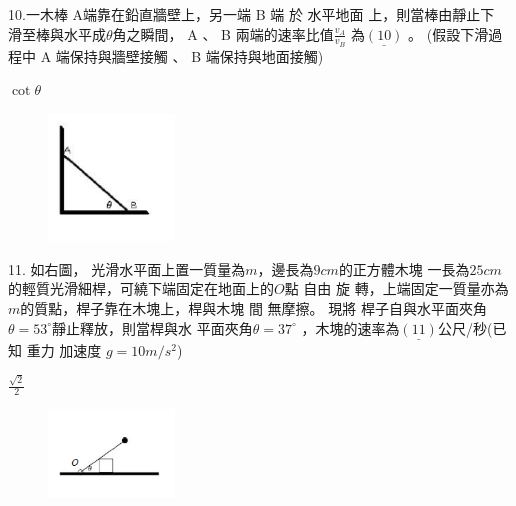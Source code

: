 \documentclass[cn,10pt,math=newtx]{elegantbook}
\begin{document}
\begin{example}
   10.一木棒 A端靠在鉛直牆壁上，另一端 B 端 於 水平地面 上，則當棒由靜止下
滑至棒與水平成$\theta$角之瞬間， A 、 B 兩端的速率比值$\frac{v_A}{v_B}$ 為$\underline{(10)}$ 。 (假設下滑過程中 A 端保持與牆壁接觸 、 B 端保持與地面接觸)
\\
    \rightline{[文華高中教甄109]}
\end{example}
\begin{solution}
    $\cot{\theta}$
\end{solution}
\begin{figure}[htbp]
    \flushright
    \includegraphics[width=0.3\textwidth]{image/109文華10.png}
  \end{figure}
\newpage


\begin{example}
  11.
如右圖， 光滑水平面上置一質量為$m$，邊長為$9cm$的正方體木塊
一長為$25cm$的輕質光滑細桿，可繞下端固定在地面上的$O$點 自由 旋
轉，上端固定一質量亦為$m$的質點，桿子靠在木塊上，桿與木塊 間
無摩擦。 現將 桿子自與水平面夾角$\theta=53^\circ$靜止釋放，則當桿與水
平面夾角$\theta=37^\circ$ ，木塊的速率為$\underline{(11)}$公尺/秒(已知 重力
加速度 $g=10m/s^2$) \\
    \rightline{[文華高中教甄109]}
\end{example}
\begin{solution}
    $\frac{\sqrt{2}} {2}$
\end{solution}
\begin{figure}[htbp]
    \flushright
    \includegraphics[width=0.3\textwidth]{image/109文華11.png}
  \end{figure}
\newpage
\end{document}
